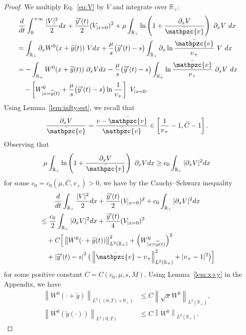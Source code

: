 \documentclass[AHL,Unicode,longabstracts,published]{cedram}
\newcommand{\R}{\mathbb{R}}
\newcommand{\p}{\partial}
\newcommand{\bv}{\bar{\mathpzc{v}}}
\newcommand{\ty}{\widetilde{y}}
\begin{document}
\begin{proof}
We multiply Eq.~\eqref{eq:V} by $V$ and integrate over $\R_+$:
\begin{multline*}
\dfrac{d}{dt} \int_0^{+\infty} \dfrac{|V|^2}{2} dx + \dfrac{\ty'(t)}{2} (V_{|x=0})^2 + \mu \int_{\R_+} \ln \left(1 + \dfrac{\partial_x V}{\bv} \right) \ \partial_x V \ dx \\
\begin{aligned}
& = \int_{\R_+} \p_x W^0(x+\ty(t)) \ V dx + \dfrac{\mu}{s} \big(\ty'(t)-s\big) \int_{\R_+} \partial_x \ln \dfrac{\bv}{v_+}\ V \ dx \\
& = - \int_{\R_+} W^{0}(x + \ty(t)) \ \partial_x V dx - \dfrac{\mu}{s} \big(\ty'(t)-s\big) \int_{\R_+} \ln \dfrac{\bv}{v_+}\ \partial_x V \ dx \\
& \quad - \left[W^{0}_{|x=\ty(t)} + \dfrac{\mu}{s} \big(\ty'(t)-s\big) \ln \dfrac{1}{v_+}\right] \ V_{|x=0}.
\end{aligned}
\end{multline*}
Using Lemma~\ref{lem:infty-est}, we recall that
\[
\frac{\p_x V}{\bv}=\frac{v-\bv}{\bv}\in \left[\frac{1}{v_+}-1, \bar C-1\right].
\]
Observing that
\[
\mu \int_{\R_+} \ln \left(1 + \dfrac{\partial_x V}{\bv} \right) \ \partial_x V dx
\geq c_0 \int_{\R_+} |\partial_x V|^{2} dx
\]
for some $c_0 = c_0(\mu,\bar C, v_+) > 0$, we have by the Cauchy--Schwarz inequality
\begin{multline*}
\dfrac{d}{dt} \int_{\R_+} \dfrac{|V|^2}{2} dx + \dfrac{\ty'(t)}{2} (V_{|x=0})^2 + c_0 \int_{\R_+} |\partial_x V|^{2} dx \\
\begin{aligned}
& \leq \dfrac{c_0}{2} \int_{\R_+} |\partial_x V|^{2} dx + \dfrac{\ty'(t)}{4} (V_{|x=0})^2 \\
& \quad + C \Big[\left\| W^{0}(\cdot + \ty(t))\right\|_{L^2(\R_+)}^2 + \left(W^{0}_{|x=\ty(t)}\right)^2\\
&\quad+ \left|\ty'(t)-s\right|^2 \big(\left\|\bv- v_+\right\|_{L^2(\R_+)}^2 + |v_+-1|^2 \big)
\Big]
\end{aligned}
\end{multline*}
for some positive constant $C = C(c_0, \mu,s, M)$. Using Lemma~\ref{lem:x+y} in the Appendix, we have
\begin{equation}\label{eq:W0-L2}
\begin{aligned}
\left\| W^{0}(\cdot + \ty)\right\|_{L^2((0,T)\times\R_+)} &\leq C\left\|\sqrt{x} W^0\right\|_{L^2(\R_+)},\\
\left\| W^{0}(\ty(\cdot))\right\|_{L^2(0,T)} &\leq C\left\| W^0\right\|_{L^2(\R_+)}.

\end{aligned}
\end{equation}
\end{proof}
\end{document}
